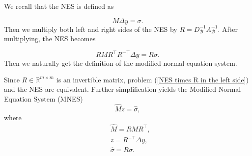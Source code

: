   We recall that the NES is defined as

\begin{equation}
    M \Delta y = \sigma.
\end{equation}
Then we multiply both left and right sides of the NES by $R=D_{\mathcal{B}}^{-1} A_{\mathcal{B}}^{-1}$.
After multiplying, the NES becomes

\begin{equation}
    \label{NES times R in the left side}
    R M R^{\top} R^{-\top} \Delta y=R\sigma.
\end{equation}
Then we naturally get the definition of the modified normal equation system. 
\begin{definition}
Since $R\in \mathbb{R}^{m \times m}$ is an invertible matrix, problem (\ref{NES times R in the left side}) and the NES are equivalent. Further simplification yields the Modified Normal Equation System (MNES)
\begin{equation}
    \label{MNES}
    \hat{M} z=\hat{\sigma},
\end{equation}
where
\begin{equation}
\begin{aligned}
    & \hat{M} = R M R^{\top},\\
    & z = R^{-\top}\Delta y,\\
    & \hat{\sigma} = R \sigma.
\end{aligned}
\end{equation}
\end{definition}